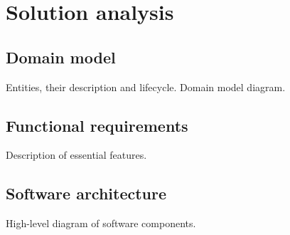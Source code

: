 
\chapter{Solution analysis}\label{ch:solution-analysis}


\section{Domain model}\label{sec:domain-model}
{\color{gray} Entities, their description and lifecycle. Domain model diagram.}


\section{Functional requirements}\label{sec:functional-requirements}
{\color{gray} Description of essential features.}


\section{Software architecture}\label{sec:software-architecture}
{\color{gray} High-level diagram of software components.}
